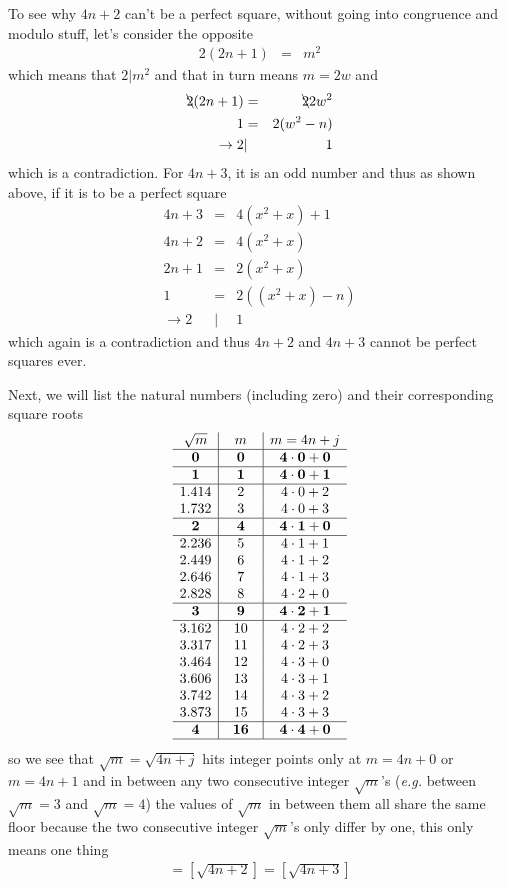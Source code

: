 \documentclass[aps,preprint,preprintnumbers,nofootinbib,showpacs,prd]{revtex4-1}
\newcommand{\eg}{{\it e.g.} }
\newcommand{\nbea}{\begin{eqnarray*}}
\newcommand{\neea}{\end{eqnarray*}}
\begin{document}
To see why $4n+2$ can't be a perfect square, without going into congruence and modulo stuff, let's consider the opposite
%
\nbea
2(2n+1) & = & m^2
\neea
%
which means that $2|m^2$ and that in turn means $m = 2w$ and
%
\nbea
\bcancel{2}(2n+1) & = & \bcancel{2}2w^2 \\
1 & = & 2 (w^2 - n) \\
\to 2 &|& 1
\neea
%
which is a contradiction. For $4n+3$, it is an odd number and thus as shown above, if it is to be a perfect square
%
\nbea
4n+3 & = & 4(x^2+x) + 1 \\
4n + 2 & = & 4(x^2+x) \\
2n + 1 & = & 2(x^2 + x) \\
1 & = & 2 ((x^2+x) - n) \\
\to 2 &|& 1
\neea
%
which again is a contradiction and thus $4n+2$ and $4n+3$ cannot be perfect squares ever.

Next, we will list  the natural numbers (including zero) and their corresponding square roots
%
\nbea
\begin{array}{c|c|c}
\sqrt{m} & ~~m~~ & m = 4n + j\\ \hline
{\bf 0} & {\bf 0} & {\bf 4\cdot0 + 0} \\ \hline
{\bf 1} & {\bf 1} & {\bf 4\cdot0 + 1} \\ \hline
1.414 & 2 & 4\cdot0 + 2 \\
1.732 & 3 & 4\cdot0 + 3 \\ \hline
{\bf 2} & {\bf 4} & {\bf 4\cdot1 + 0} \\ \hline
2.236 & 5 & 4\cdot1 + 1 \\
2.449 & 6 & 4\cdot1 + 2 \\
2.646 & 7 & 4\cdot1 + 3 \\
2.828 & 8 & 4\cdot2 + 0 \\ \hline
{\bf 3} & {\bf 9} & {\bf 4\cdot2 + 1} \\ \hline
3.162 & 10 & 4\cdot2 + 2 \\
3.317 & 11 & 4\cdot2 + 3 \\
3.464 & 12 & 4\cdot3 + 0 \\
3.606 & 13 & 4\cdot3 + 1 \\           
3.742 & 14 & 4\cdot3 + 2 \\           
3.873 & 15 & 4\cdot3 + 3 \\ \hline           
{\bf 4} & {\bf 16} & {\bf 4\cdot4 + 0} \\ \hline          
\end{array}
\neea
%
so we see that $\sqrt{m} = \sqrt{4n+j}$ hits integer points only at $m=4n+0$ or $m=4n+1$ and in between any two consecutive integer $\sqrt{m}$'s (\eg between $\sqrt{m} = 3$ and $\sqrt{m} = 4$) the values of $\sqrt{m}$ in between them all share the same floor because the two consecutive integer $\sqrt{m}$'s only differ by one, this only means one thing
%
\nbea
[\sqrt{4n+1}] = [\sqrt{4n+2}] = [\sqrt{4n+3}]
\neea
%
\end{document}
